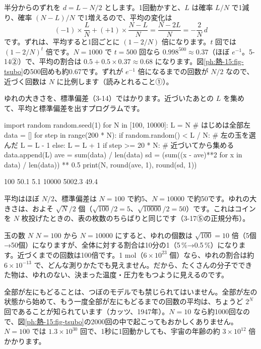 半分からのずれを $d=L-N/2$ とします。1回動かすと、$L$ は確率 $L/N$ で1減り、確率 $(N-L)/N$ で1増えるので、平均の変化は
\[(-1)\times\frac{L}{N}+(+1)\times\frac{N-L}{N}=\frac{N-2L}{N}=-\frac{2}{N}\,d\]
です。ずれは、平均すると1回ごとに $(1-2/N)$ 倍になります。$t$ 回では $(1-2/N)^t$ 倍です。$N=1000$ で $t=500$ 回なら $0.998^{500}\approx0.37$（ほぼ $e^{-1}$。5-14②）で、平均の割合は $0.5+0.5\times0.37\approx0.68$ になります。図\ref{ph:熱-15:fig-tsubo}の500回めも約0.67です。ずれが $e^{-1}$ 倍になるまでの回数が $N/2$ なので、近づく回数は $N$ に比例します（読みとれること①）。

ゆれの大きさを、標準偏差（3-14）ではかります。近づいたあとの $L$ を集めて、平均と標準偏差を出すプログラムです。
\begin{phcode}[Python]
import random
random.seed(1)
for N in [100, 10000]:
    L = N                      \# はじめは全部左
    data = []
    for step in range(200 * N):
        if random.random() < L / N:   \# 左の玉を選んだ
            L = L - 1
        else:
            L = L + 1
        if step >= 20 * N:            \# 近づいてから集める
            data.append(L)
    ave = sum(data) / len(data)
    sd = (sum((x - ave)**2 for x in data) / len(data)) ** 0.5
    print(N, round(ave, 1), round(sd, 1))
\end{phcode}
\begin{phcodeout}
100 50.1 5.1
10000 5002.3 49.4
\end{phcodeout}
平均はほぼ $N/2$、標準偏差は $N=100$ で約5、$N=\num{10000}$ で約50です。ゆれの大きさは、およそ $\sqrt N/2$ 個（$\sqrt{100}/2=5$、$\sqrt{\num{10000}}/2=50$）です。これはコインを $N$ 枚投げたときの、表の枚数のちらばりと同じです（3-17⑤の正規分布）。

\begin{phbaisuru}[100倍]{玉の数 $N$}
$N=100$ から $N=\num{10000}$ にすると、ゆれの個数は $\sqrt{100}=10$ 倍（5個→50個）になりますが、全体に対する割合は10分の1（5\,\%→0.5\,\%）になります。近づくまでの回数は100倍です。1 mol（$6\times10^{23}$ 個）なら、ゆれの割合は約 $6\times10^{-13}$ で、どんな測りかたでも見えません。だから、たくさんの分子でできた物は、ゆれのない、決まった温度・圧力をもつように見えるのです。
\end{phbaisuru}

\begin{seikaku}
全部が左にもどることは、つぼのモデルでも禁じられてはいません。全部が左の状態から始めて、もう一度全部が左にもどるまでの回数の平均は、ちょうど $2^N$ 回であることが知られています（カッツ、1947年）。$N=10$ なら約\num{1000}回なので、図\ref{ph:熱-15:fig-tsubo}の\num{2000}回の中で起こってもおかしくありません。$N=100$ では $1.3\times10^{30}$ 回で、1秒に1回動かしても、宇宙の年齢の約 $3\times10^{12}$ 倍かかります。
\end{seikaku}

